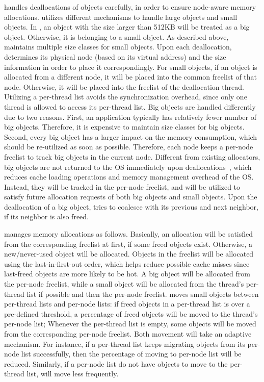 \NA{} handles deallocations of objects carefully, in order to ensure node-aware memory allocations. \NA{} utilizes different mechanisms to handle large objects and small objects. In \NM{}, an object with the size larger than 512KB will be treated as a big object. Otherwise, it is belonging to a small object. As described above, \NM{} maintains multiple size classes for small objects. Upon each deallocation, \NA{} determines its physical node (based on its virtual address) and the size information in order to place it correspondingly. For small objects, if an object is allocated from a different node, it will be placed into the common freelist of that node. Otherwise, it will be placed into the freelist of the deallocation thread. Utilizing a per-thread list avoids the synchronization overhead, since only one thread is allowed to access its per-thread list. 
Big objects are handled differently due to two reasons. First, an application typically has relatively fewer number of big objects. Therefore, it is expensive to maintain size classes for big objects. Second, every big object has a larger impact on the memory consumption, which should be re-utilized as soon as possible. Therefore, each node keeps a per-node freelist to track big objects in the current node. Different from existing allocators, big objects are not returned to the OS immediately upon deallocations~\cite{Hoard, tcmalloc}, which reduces cache loading operations and memory management overhead of the OS.  Instead, they will be tracked in the per-node freelist, and will be utilized to satisfy future allocation requests of both big objects and small objects. Upon the deallocation of a big object, \NM{} tries to coalesce with its previous and next neighbor, if its neighbor is also freed.  
 
\NA{} manages memory allocations as follows. Basically, an allocation will be satisfied from the corresponding freelist at first, if some freed objects exist. Otherwise, a new/never-used object will be allocated.  Objects in the freelist will be allocated using the last-in-first-out order, which helps reduce possible cache misses since last-freed objects are more likely to be hot. A big object will be allocated from the per-node freelist, while a small object will be allocated from the thread's per-thread list if possible and then the per-node freelist. \NM{} moves small objects between per-thread lists and per-node lists: if freed objects in a per-thread list is over a pre-defined threshold, a percentage of freed objects will be moved to the thread's per-node list; Whenever the per-thread list is empty, some objects will be moved from the corresponding per-node freelist. Both movement will take an adaptive mechanism. For instance, if a per-thread list keeps migrating objects from its per-node list successfully, then the percentage of moving to per-node list will be reduced. Similarly, if a per-node list do not have objects to move to the per-thread list, \NM{} will move less frequently.  

